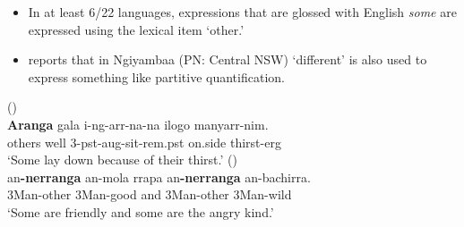 \documentclass{article}
\begin{document}
\begin{itemize}
\item  In at least 6/22 languages, expressions that are glossed with English \textit{some} are expressed using the lexical item `other.' 
\item \citet[73]{donaldson80} reports that in Ngiyambaa (PN: Central NSW) `different' is also used to express something like partitive quantification. %
\end{itemize}


\begin{exe}
   (\citealt[268]{bowern12})\\
  \gll \textbf{Aranga} gala i-ng-arr-na-na ilogo manyarr-nim.\\
  others well 3-{\sc pst-aug}-sit-{\sc rem.pst} on.side thirst-{\sc erg}\\
  \glt `Some lay down because of their thirst.'
   (\citealt[84]{green87})\\
  \gll an\textbf{-nerranga}    an-mola    rrapa    an\textbf{-nerranga}    an-bachirra.\\
  3Man-other    3Man-good    and    3Man-other    3Man-wild\\
  \glt `Some are friendly and some are the angry kind.'


\end{exe}

\end{document}
